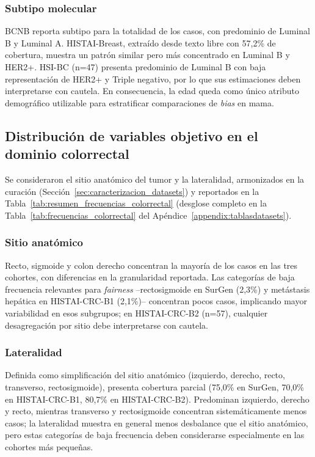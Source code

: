 \subsubsection*{Subtipo molecular}

BCNB reporta subtipo para la totalidad de los casos, con predominio de Luminal B y Luminal A. HISTAI-Breast, extraído desde texto libre con 57,2\% de cobertura, muestra un patrón similar pero más concentrado en Luminal B y HER2+. HSI-BC (n=47) presenta predominio de Luminal B con baja representación de HER2+ y Triple negativo, por lo que sus estimaciones deben interpretarse con cautela. En consecuencia, la edad queda como único atributo demográfico utilizable para estratificar comparaciones de \textit{bias} en mama.

\subsection{Distribución de variables objetivo en el dominio colorrectal}

Se consideraron el sitio anatómico del tumor y la lateralidad, armonizados en la curación (Sección~\ref{sec:caracterizacion_datasets}) y reportados en la Tabla~\ref{tab:resumen_frecuencias_colorrectal} (desglose completo en la Tabla~\ref{tab:frecuencias_colorrectal} del Apéndice~\ref{appendix:tablasdatasets}).

\subsubsection*{Sitio anatómico}

Recto, sigmoide y colon derecho concentran la mayoría de los casos en las tres cohortes, con diferencias en la granularidad reportada. Las categorías de baja frecuencia relevantes para \textit{fairness} --rectosigmoide en SurGen (2,3\%) y metástasis hepática en HISTAI-CRC-B1 (2,1\%)-- concentran pocos casos, implicando mayor variabilidad en esos subgrupos; en HISTAI-CRC-B2 (n=57), cualquier desagregación por sitio debe interpretarse con cautela.

\subsubsection*{Lateralidad}

Definida como simplificación del sitio anatómico (izquierdo, derecho, recto, transverso, rectosigmoide), presenta cobertura parcial (75,0\% en SurGen, 70,0\% en HISTAI-CRC-B1, 80,7\% en HISTAI-CRC-B2). Predominan izquierdo, derecho y recto, mientras transverso y rectosigmoide concentran sistemáticamente menos casos; la lateralidad muestra en general menos desbalance que el sitio anatómico, pero estas categorías de baja frecuencia deben considerarse especialmente en las cohortes más pequeñas.

